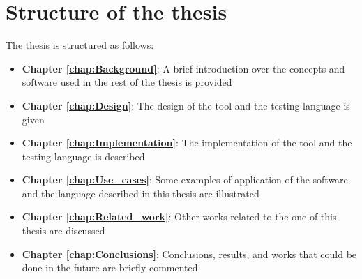 \section{Structure of the thesis}
The thesis is structured as follows:
\begin{itemize}
    \item \textbf{Chapter \ref{chap:Background}}: A brief introduction over the concepts and software used in the rest of the thesis is provided
    \item \textbf{Chapter \ref{chap:Design}}: The design of the tool and the testing language is given
    \item \textbf{Chapter \ref{chap:Implementation}}: The implementation of the tool and the testing language is described
    \item \textbf{Chapter \ref{chap:Use_cases}}: Some examples of application of the software and the language described in this thesis are illustrated
    \item \textbf{Chapter \ref{chap:Related_work}}: Other works related to the one of this thesis are discussed
    \item \textbf{Chapter \ref{chap:Conclusions}}: Conclusions, results, and works that could be done in the future are briefly commented
\end{itemize}




